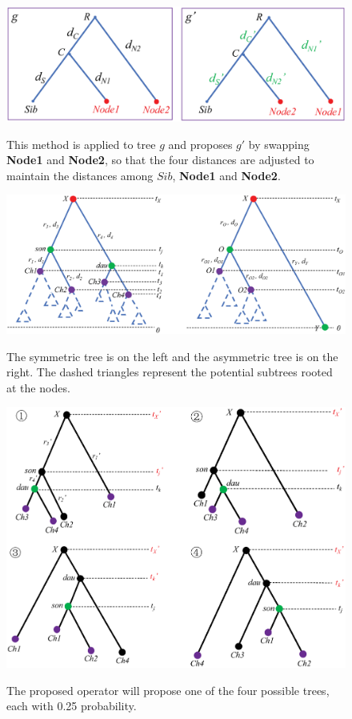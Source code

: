 \documentclass{bmcart}
\begin{document}
\begin{backmatter}
\begin{figure}[h!]
\includegraphics[width=12cm]{exchangemethod.eps}\\
\caption{
             This method is applied to tree $g$ and proposes $g'$ by swapping \textbf{Node1} and \textbf{Node2}, so that the four distances are adjusted to maintain the distances among $Sib$, \textbf{Node1} and \textbf{Node2}.}
\label{exchangemethod}
\end{figure}

\begin{figure}[h!]
\includegraphics[width=12cm]{treeshape.eps}\\
\caption{
             The symmetric tree is on the left and the asymmetric tree is on the right. The dashed triangles represent the potential subtrees rooted at the nodes.}
\label{treeshape}
\end{figure}

\begin{figure}[h!]
\includegraphics[width=12cm]{symmetric.eps}\\
\caption{
             The proposed operator will propose one of the four possible trees, each with 0.25 probability.}
\label{symmetric}
\end{figure}


\end{backmatter}
\end{document}
